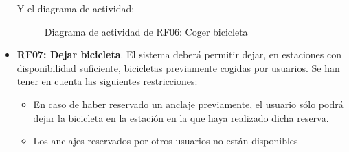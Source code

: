\begin{itemize}
	\FloatBarrier
	Y el diagrama de actividad:
	\begin{figure}[!htb]
		\centering
		\caption{Diagrama de actividad de RF06: Coger bicicleta}
		\label{fig:diagramaActividad_RF06}
	\end{figure}
	
	\FloatBarrier
	\item \textbf{RF07: Dejar bicicleta}. El sistema deberá permitir dejar, en estaciones con disponibilidad suficiente, bicicletas previamente cogidas por usuarios. Se han tener en cuenta las siguientes restricciones:
	\begin{itemize}
		\item En caso de haber reservado un anclaje previamente, el usuario sólo podrá dejar la bicicleta en la estación en la que haya realizado dicha reserva.
		\item Los anclajes reservados por otros usuarios no están disponibles
	\end{itemize}
	

\end{itemize}
